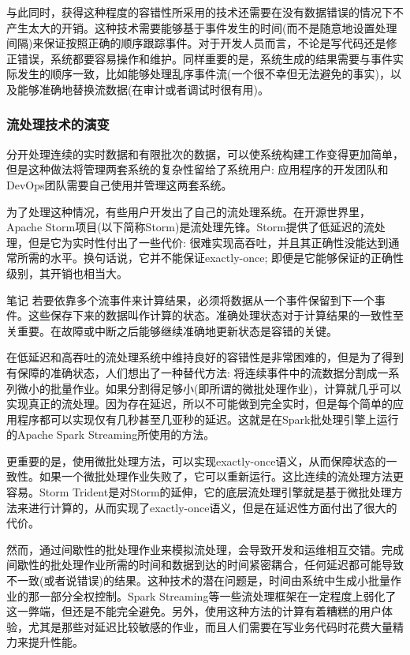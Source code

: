 \documentclass{ctexart}
\begin{document}
与此同时，获得这种程度的容错性所采用的技术还需要在没有数据错误的情况下不产生太大的开销。这种技术需要能够基于事件发生的时间(而不是随意地设置处理间隔)来保证按照正确的顺序跟踪事件。对于开发人员而言，不论是写代码还是修正错误，系统都要容易操作和维护。同样重要的是，系统生成的结果需要与事件实际发生的顺序一致，比如能够处理乱序事件流(一个很不幸但无法避免的事实)，以及能够准确地替换流数据(在审计或者调试时很有用)。

\subsubsection{流处理技术的演变}

分开处理连续的实时数据和有限批次的数据，可以使系统构建工作变得更加简单，但是这种做法将管理两套系统的复杂性留给了系统用户: 应用程序的开发团队和DevOps团队需要自己使用并管理这两套系统。

为了处理这种情况，有些用户开发出了自己的流处理系统。在开源世界里，Apache Storm项目(以下简称Storm)是流处理先锋。Storm提供了低延迟的流处理，但是它为实时性付出了一些代价: 很难实现高吞吐，并且其正确性没能达到通常所需的水平。换句话说，它并不能保证exactly-once; 即便是它能够保证的正确性级别，其开销也相当大。

\begin{bclogo}[logo=\bcinfo, couleurBarre=orange, noborder=true, couleur=white]{笔记}
若要依靠多个流事件来计算结果，必须将数据从一个事件保留到下一个事件。这些保存下来的数据叫作计算的状态。准确处理状态对于计算结果的一致性至关重要。在故障或中断之后能够继续准确地更新状态是容错的关键。
\end{bclogo}

在低延迟和高吞吐的流处理系统中维持良好的容错性是非常困难的，但是为了得到有保障的准确状态，人们想出了一种替代方法: 将连续事件中的流数据分割成一系列微小的批量作业。如果分割得足够小(即所谓的微批处理作业)，计算就几乎可以实现真正的流处理。因为存在延迟，所以不可能做到完全实时，但是每个简单的应用程序都可以实现仅有几秒甚至几亚秒的延迟。这就是在Spark批处理引擎上运行的Apache Spark Streaming所使用的方法。

更重要的是，使用微批处理方法，可以实现exactly-once语义，从而保障状态的一致性。如果一个微批处理作业失败了，它可以重新运行。这比连续的流处理方法更容易。Storm Trident是对Storm的延伸，它的底层流处理引擎就是基于微批处理方法来进行计算的，从而实现了exactly-once语义，但是在延迟性方面付出了很大的代价。

然而，通过间歇性的批处理作业来模拟流处理，会导致开发和运维相互交错。完成间歇性的批处理作业所需的时间和数据到达的时间紧密耦合，任何延迟都可能导致不一致(或者说错误)的结果。这种技术的潜在问题是，时间由系统中生成小批量作业的那一部分全权控制。Spark Streaming等一些流处理框架在一定程度上弱化了这一弊端，但还是不能完全避免。另外，使用这种方法的计算有着糟糕的用户体验，尤其是那些对延迟比较敏感的作业，而且人们需要在写业务代码时花费大量精力来提升性能。
\end{document}
